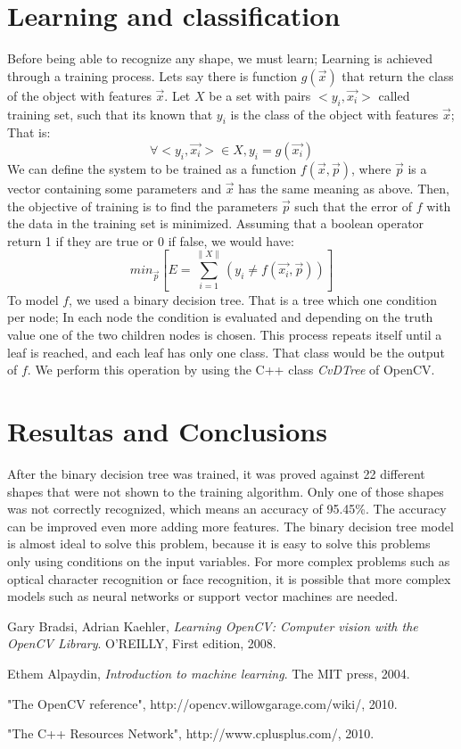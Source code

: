\documentclass{article}
\begin{document}
	\section{Learning and classification}
	Before being able to recognize any shape, we must learn; Learning is achieved
	through a training process.  Lets say there is function $g(\vec{x})$ that 
	return the class of the object with features $\vec{x}$. 
	Let $X$ be a set with pairs $<y_i,\vec{x_i}>$ called training set, such that
	its known that $y_i$ is the class of the object with features $\vec{x}$; That is:
	\[ \forall <y_i,\vec{x_i}> \in X , y_i=g(\vec{x_i}) \]
	We can define the system to be trained as a function $f(\vec{x},\vec{p})$,
	where $\vec{p}$ is a vector containing some parameters and $\vec{x}$ has
	the same meaning as above. Then, the objective of training is to find the
	parameters $\vec{p}$ such that the error of $f$ with the data in the training
	set is minimized. Assuming that a boolean operator return 1 if they are true
	or 0 if false, we would have:
	\[ min_{\vec{p}} \left[ E = \sum_{i=1}^{\| X \|}  
		( y_i \not= f(\vec{x_i},\vec{p}) ) \right] \]
	To model $f$, we used a binary decision tree. That is a tree which one
	condition per node; In each node the condition is evaluated and depending
	on the truth value one of the two children nodes is chosen. This process
	repeats itself until a leaf is reached, and each leaf has only one class.
	That class would be the output of $f$. We perform this operation by using the
	C++ class \textit{CvDTree} of OpenCV. 
	
	\section{Resultas and Conclusions}
	After the binary decision tree was trained, it was proved against 22 different
	shapes that were not shown to the training algorithm. Only one of those shapes
	was not correctly recognized, which means an accuracy of 95.45\%. The accuracy can
	be improved even more adding more features.
	The binary decision tree model is almost ideal to solve this problem, because it
	is easy to solve this problems only using conditions on the input variables. For
	more complex problems such as optical character recognition or face recognition,
	it is possible that more complex models such as neural networks or support vector
	machines are needed.
	
	\begin{thebibliography}{9}
	
			Gary Bradsi, Adrian Kaehler,
			\emph{Learning OpenCV: Computer vision with the OpenCV Library}.
			O'REILLY,
			First edition,
			2008.
			
			Ethem Alpaydin,
			\emph{Introduction to machine learning}.
			The MIT press,
			2004.
		
			"The OpenCV reference",
			http://opencv.willowgarage.com/wiki/,
			2010.
			
			"The C++ Resources Network",
			http://www.cplusplus.com/,
			2010.
			
	\end{thebibliography}
	
\end{document}
